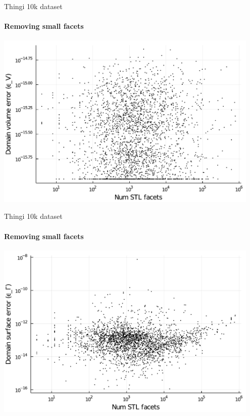 \documentclass{beamer}
\begin{document}
\begin{frame}{Thingi 10k dataset}
  \framesubtitle{Removing small facets}
  \includegraphics[width=0.95\textwidth]{../analysis/plots/num_stl_facets_volume_error}
\end{frame}

\begin{frame}{Thingi 10k dataset}
  \framesubtitle{Removing small facets}
  \includegraphics[width=0.95\textwidth]{../analysis/plots/num_stl_facets_surface_error}
\end{frame}
\end{document}
